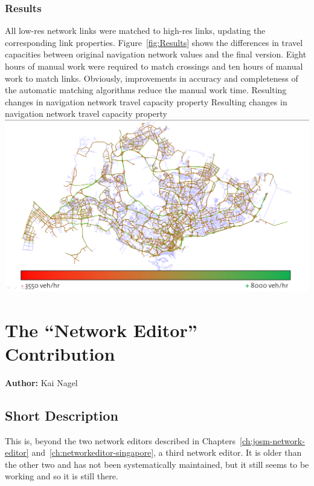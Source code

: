 \subsection{Results}
All low-res network links were matched to high-res links, updating the corresponding link properties. Figure~\ref{fig:Results} shows the differences in travel capacities between original navigation network values and the final version. Eight hours of manual work were required to match crossings and ten hours of manual work to match links. Obviously, improvements in accuracy and completeness of the automatic matching algorithms reduce the manual work time.
%
\createfigure
{Resulting changes in navigation network travel capacity property}
{Resulting changes in navigation network travel capacity property}
{\label{fig:Results}}
{\includegraphics[width=1.0\textwidth]{extending/figures/netEdSing/Result.png}}
{}

\chapter{The ``Network Editor'' Contribution}
\label{ch:contrib-networkEditor}

\hfill \textbf{Author:} Kai Nagel


\section{Short Description}

This is, beyond the two network editors described in 
Chapters~\ref{ch:josm-network-editor} and~\ref{ch:networkeditor-singapore}, 
a third network editor. 
It is older than the other two and has not been systematically maintained, but it still seems to be working and so it is still there.


